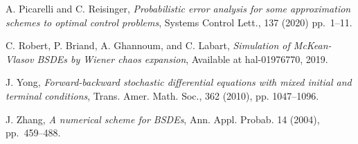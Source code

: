 \documentclass[11pt]{article}
\numberwithin{equation}{section}
\theoremstyle{definition}
\theoremstyle{remark}
\begin{document}
\begin{thebibliography}{1}
A. Picarelli and C. Reisinger,
\emph{Probabilistic error analysis for some approximation schemes to optimal control problems},
Systems Control Lett., 137 (2020) pp.~1--11.

%

C. Robert, P. Briand, A. Ghannoum, and C. Labart, 
\emph{Simulation of McKean-Vlasov BSDEs by Wiener chaos expansion}, 
Available at hal-01976770,
2019.

J. Yong, \emph{Forward-backward stochastic differential equations with mixed initial and terminal
conditions}, Trans. Amer. Math. Soc., 362 (2010), pp. 1047--1096.

J. Zhang, \emph{A numerical scheme for BSDEs}, Ann. Appl. Probab. 14 (2004), pp.~459--488.



\end{thebibliography}

 
\end{document}
